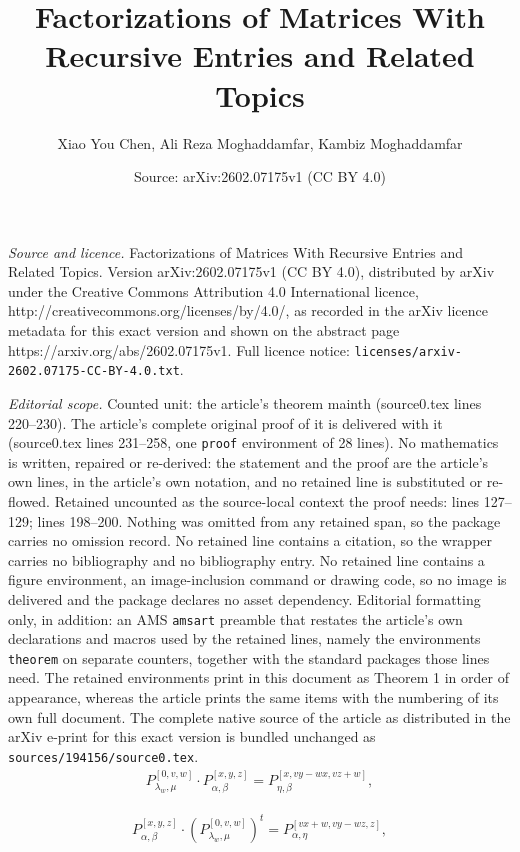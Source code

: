 \documentclass[10pt,a4paper]{amsart}
\title{Factorizations of Matrices With Recursive Entries and Related Topics}
\author{Xiao You Chen, Ali Reza Moghaddamfar, Kambiz Moghaddamfar}
\date{Source: arXiv:2602.07175v1 (CC BY 4.0)}
\begin{document}
\maketitle

\noindent\emph{Source and licence.} Factorizations of Matrices With Recursive Entries and Related Topics. Version arXiv:2602.07175v1 (CC BY 4.0), distributed by arXiv under the Creative Commons Attribution 4.0 International licence, http://creativecommons.org/licenses/by/4.0/, as recorded in the arXiv licence metadata for this exact version and shown on the abstract page https://arxiv.org/abs/2602.07175v1. Full licence notice: \texttt{licenses/arxiv-2602.07175-CC-BY-4.0.txt}.\par\smallskip

\noindent\textit{Editorial scope.} Counted unit: the article's theorem mainth (source0.tex lines 220--230). The article's complete original proof of it is delivered with it (source0.tex lines 231--258, one \texttt{proof} environment of 28 lines). No mathematics is written, repaired or re-derived: the statement and the proof are the article's own lines, in the article's own notation, and no retained line is substituted or re-flowed.  Retained uncounted as the source-local context the proof needs: lines 127--129; lines 198--200.  Nothing was omitted from any retained span, so the package carries no omission record.  No retained line contains a citation, so the wrapper carries no bibliography and no bibliography entry.  No retained line contains a figure environment, an image-inclusion command or drawing code, so no image is delivered and the package declares no asset dependency.  Editorial formatting only, in addition: an AMS \texttt{amsart} preamble that restates the article's own declarations and macros used by the retained lines, namely the environments \texttt{theorem} on separate counters, together with the standard packages those lines need.  The retained environments print in this document as Theorem 1 in order of appearance, whereas the article prints the same items with the numbering of its own full document.  The complete native source of the article as distributed in the arXiv e-print for this exact version is bundled unchanged as \texttt{sources/194156/source0.tex}.
\begin{align}\label{eq1}
P_{\lambda_w, \mu}^{[0, v, w]} \cdot P_{\alpha, \beta}^{[x, y, z]}=P^{[x, vy-wx, vz+w]}_{\eta, \beta},
\end{align}

\begin{align}\label{eq7}
P_{\alpha, \beta}^{[x, y, z]}\cdot (P_{\lambda_w, \mu}^{[0, v, w]})^t=P^{[vx+w, vy-wz, z]}_{\alpha, \eta},
\end{align}
\end{document}
